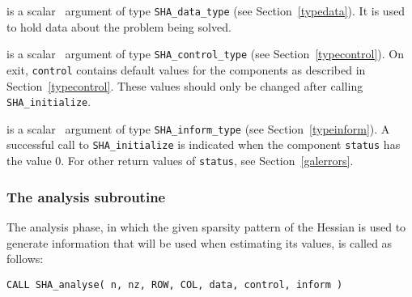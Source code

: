 \documentclass{galahad}
\newcommand{\packagename}{SHA}
\begin{document}
\vspace*{-3mm}
\begin{description}

 is a scalar \intentinout\ argument of type
{\tt \packagename\_data\_type}
(see Section~\ref{typedata}). It is used to hold data about the problem being
solved.

 is a scalar \intentout\ argument of type
{\tt \packagename\_control\_type}
(see Section~\ref{typecontrol}).
On exit, {\tt control} contains default values for the components as
described in Section~\ref{typecontrol}.
These values should only be changed after calling
{\tt \packagename\_initialize}.

 is a scalar \intentout\ argument of type
{\tt \packagename\_inform\_type}
(see Section~\ref{typeinform}). A successful call to
{\tt \packagename\_initialize}
is indicated when the  component {\tt status} has the value 0.
For other return values of {\tt status}, see Section~\ref{galerrors}.

\end{description}


\subsubsection{The analysis subroutine}
The analysis phase, in which the given sparsity pattern of the Hessian
is used to generate information that will be used when estimating
its values, is called as follows:

\vspace*{1mm}

\hspace{8mm}
{\tt CALL \packagename\_analyse( n, nz, ROW, COL, data, control, inform )}
\end{document}
